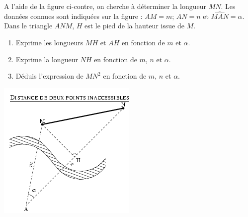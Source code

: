 
\begin{multicols}{2}
A l'aide de la figure ci-contre, on
  cherche à déterminer la longueur $MN$. Les données connues sont
  indiquées sur la figure : $AM=m$; $AN=n$ et
  $\widehat{MAN}=\alpha$. Dans le triangle $ANM$, $H$ est le pied de
  la hauteur issue de $M$.
  \begin{enumerate}
    \item Exprime les longueurs $MH$ et $AH$ en fonction de $m$ et $\alpha$.
    \item Exprime la longueur $NH$ en fonction de $m$, $n$ et
      $\alpha$.
    \item Déduis l'expression de $MN^2$ en fonction de $m$, $n$ et $\alpha$.
  \end{enumerate}
 \includegraphics[scale=1]{TR-216.png}  
  \end{multicols}